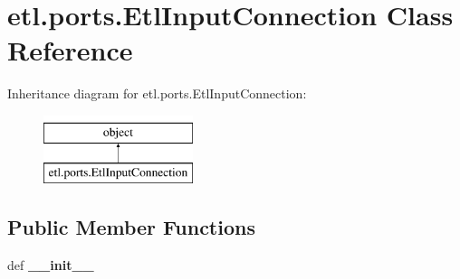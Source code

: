 \hypertarget{classetl_1_1ports_1_1EtlInputConnection}{\section{etl.\-ports.\-Etl\-Input\-Connection Class Reference}
\label{classetl_1_1ports_1_1EtlInputConnection}
}
Inheritance diagram for etl.\-ports.\-Etl\-Input\-Connection\-:\begin{figure}[H]
\begin{center}
\leavevmode
\includegraphics[height=2.000000cm]{classetl_1_1ports_1_1EtlInputConnection}
\end{center}
\end{figure}
\subsection*{Public Member Functions}
\begin{DoxyCompactItemize}
\item 
\hypertarget{classetl_1_1ports_1_1EtlInputConnection_a3bbacdfad36e5944e39eb33202434486}{def {\bfseries \-\_\-\-\_\-init\-\_\-\-\_\-}}\label{classetl_1_1ports_1_1EtlInputConnection_a3bbacdfad36e5944e39eb33202434486}

\end{DoxyCompactItemize}
